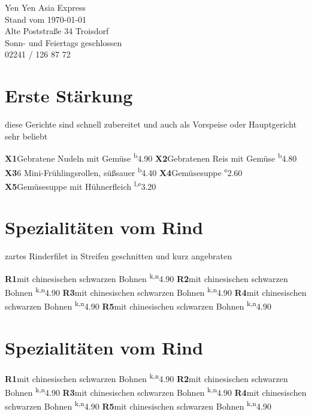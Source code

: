 \documentclass[a4paper,10pt,notumble]{leaflet}
\newcommand{\meal}[4]{\textbf{#1}\hspace{3mm}#2 \textsuperscript{#3}\hfill\SI{#4}{\EUR}\newline}
\newcommand{\Fisch}{b}
\newcommand{\Sellerie}{e}
\newcommand{\Senf}{k}
\newcommand{\Soja}{l}
\newcommand{\Erdnuss}{n}
\begin{document}
 

{\Huge Yen Yen Asia Express}\\
{\small Stand vom \today}\\


Alte Poststraße 34 Troisdorf\\

Sonn- und Feiertags geschlossen\\

{\Huge 02241 / 126 87 72}

\section*{Erste Stärkung}
diese Gerichte sind schnell zubereitet und 
auch als Vorspeise oder Hauptgericht sehr beliebt
\begin{flushleft}
\meal{X1}{Gebratene Nudeln mit Gemüse}{\Fisch}{4.90}
\meal{X2}{Gebratenen Reis mit Gemüse}{\Fisch}{4.80}
\meal{X3}{6 Mini-Frühlingsrollen, süßsauer}{\Fisch}{4.40}
\meal{X4}{Gemüsesuppe}{\Sellerie}{2.60}
\meal{X5}{Gemüsesuppe mit Hühnerfleich}{\Soja,\Sellerie}{3.20}
\end{flushleft}

\section*{Spezialitäten vom Rind}
zartes Rinderfilet in Streifen geschnitten und kurz angebraten
\begin{flushleft}
\meal{R1}{mit chinesischen schwarzen Bohnen}{\Senf,\Erdnuss}{4.90}
\meal{R2}{mit chinesischen schwarzen Bohnen}{\Senf,\Erdnuss}{4.90}
\meal{R3}{mit chinesischen schwarzen Bohnen}{\Senf,\Erdnuss}{4.90}
\meal{R4}{mit chinesischen schwarzen Bohnen}{\Senf,\Erdnuss}{4.90}
\meal{R5}{mit chinesischen schwarzen Bohnen}{\Senf,\Erdnuss}{4.90}
\end{flushleft}


\section*{Spezialitäten vom Rind}
\meal{R1}{mit chinesischen schwarzen Bohnen}{\Senf,\Erdnuss}{4.90}
\meal{R2}{mit chinesischen schwarzen Bohnen}{\Senf,\Erdnuss}{4.90}
\meal{R3}{mit chinesischen schwarzen Bohnen}{\Senf,\Erdnuss}{4.90}
\meal{R4}{mit chinesischen schwarzen Bohnen}{\Senf,\Erdnuss}{4.90}
\meal{R5}{mit chinesischen schwarzen Bohnen}{\Senf,\Erdnuss}{4.90}
\end{document}
